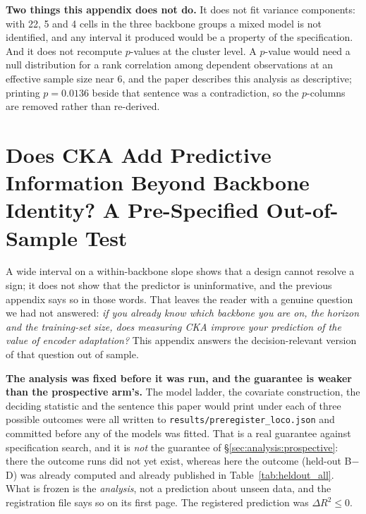 \textbf{Two things this appendix does not do.} It does not fit variance
components: with 22, 5 and 4 cells in the three backbone groups a mixed model is
not identified, and any interval it produced would be a property of the
specification. And it does not recompute $p$-values at the cluster level. A
$p$-value would need a null distribution for a rank correlation among dependent
observations at an effective sample size near 6, and the paper describes this
analysis as descriptive; printing $p{=}0.0136$ beside that sentence was a
contradiction, so the $p$-columns are removed rather than re-derived.

\section{Does CKA Add Predictive Information Beyond Backbone Identity? A Pre-Specified
Out-of-Sample Test}
\label{app:loco}

A wide interval on a within-backbone slope shows that a design cannot resolve a
sign; it does not show that the predictor is uninformative, and the previous
appendix says so in those words.  That leaves the reader with a genuine question
we had not answered: \emph{if you already know which backbone you are on, the
horizon and the training-set size, does measuring CKA improve your prediction of
the value of encoder adaptation?}  This appendix answers the decision-relevant
version of that question out of sample.

\textbf{The analysis was fixed before it was run, and the guarantee is weaker than
the prospective arm's.}  The model ladder, the covariate construction, the
deciding statistic and the sentence this paper would print under each of three
possible outcomes were all written to
\texttt{results/preregister\_loco.json} and committed before any of the models was
fitted.  That is a real guarantee against specification search, and it is
\emph{not} the guarantee of \S\ref{sec:analysis:prospective}: there the outcome runs did not
yet exist, whereas here the outcome (held-out B$-$D) was already computed and
already published in Table~\ref{tab:heldout_all}.  What is frozen is the
\emph{analysis}, not a prediction about unseen data, and the registration file says
so on its first page.  The registered prediction was
$\Delta R^2 \leq 0$.

